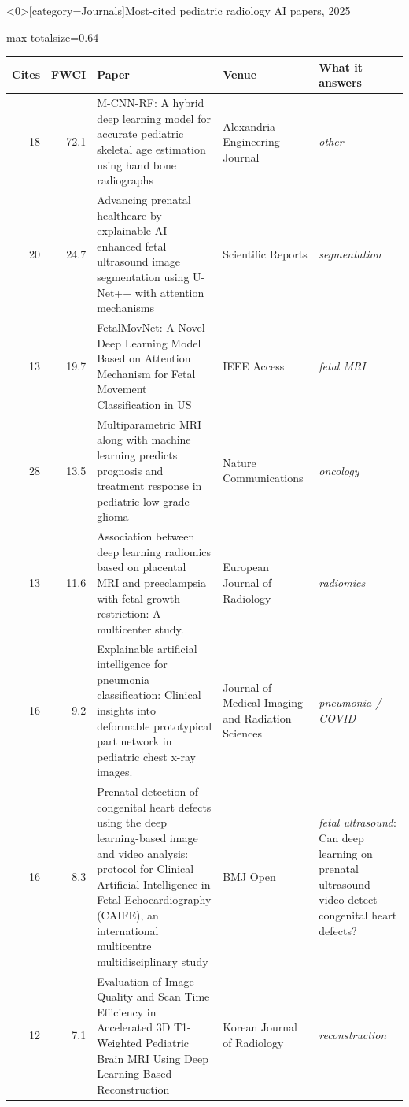 \documentclass[aspectratio=169]{beamer}
\renewcommand{\arraystretch}{1.08}
\begin{document}
\begin{frame}<0>[category=Journals]{Most-cited pediatric radiology AI papers, 2025}
\tiny
\begin{adjustbox}{max totalsize={\textwidth}{0.64\textheight}}
\renewcommand{\arraystretch}{1.2}
\begin{tabular}{|r|r|>{\raggedright\arraybackslash}p{}|>{\raggedright\arraybackslash}p{}|>{\raggedright\arraybackslash}p{}|}
\hline \textbf{Cites} & \textbf{FWCI} & \textbf{Paper} & \textbf{Venue} & \textbf{What it answers} \\ \hline
18 & 72.1 & M-CNN-RF: A hybrid deep learning model for accurate pediatric skeletal age estimation using hand bone radiographs & Alexandria Engineering Journal & \textit{other} \\ \hline
20 & 24.7 & Advancing prenatal healthcare by explainable AI enhanced fetal ultrasound image segmentation using U-Net++ with attention mechanisms & Scientific Reports & \textit{segmentation} \\ \hline
13 & 19.7 & FetalMovNet: A Novel Deep Learning Model Based on Attention Mechanism for Fetal Movement Classification in US & IEEE Access & \textit{fetal MRI} \\ \hline
28 & 13.5 & Multiparametric MRI along with machine learning predicts prognosis and treatment response in pediatric low-grade glioma & Nature Communications & \textit{oncology} \\ \hline
13 & 11.6 & Association between deep learning radiomics based on placental MRI and preeclampsia with fetal growth restriction: A multicenter study. & European Journal of Radiology & \textit{radiomics} \\ \hline
16 & 9.2 & Explainable artificial intelligence for pneumonia classification: Clinical insights into deformable prototypical part network in pediatric chest x-ray images. & Journal of Medical Imaging and Radiation Sciences & \textit{pneumonia / COVID} \\ \hline
16 & 8.3 & Prenatal detection of congenital heart defects using the deep learning-based image and video analysis: protocol for Clinical Artificial Intelligence in Fetal Echocardiography (CAIFE), an international multicentre multidisciplinary study & BMJ Open & \textit{fetal ultrasound}: Can deep learning on prenatal ultrasound video detect congenital heart defects? \\ \hline
12 & 7.1 & Evaluation of Image Quality and Scan Time Efficiency in Accelerated 3D T1-Weighted Pediatric Brain MRI Using Deep Learning-Based Reconstruction & Korean Journal of Radiology & \textit{reconstruction} \\ \hline

\end{tabular}
\end{adjustbox}
\end{frame}
\end{document}
